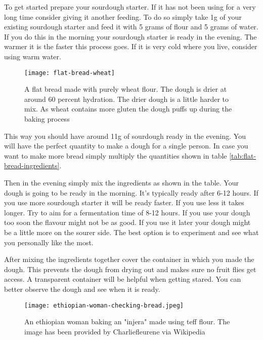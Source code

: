 To get started prepare your sourdough starter. If it has not been using for a very
long time consider giving it another feeding. To do so simply take 1g of your
existing sourdough starter and feed it with 5 grams of flour and 5 grams of water.
If you do this in the morning your sourdough starter is ready in the evening. The
warmer it is the faster this process goes. If it is very cold where you live, consider
using warm water.

\begin{figure}[htb!]
  \texttt{[image: flat-bread-wheat]}
  \centering
  \caption{A flat bread made with purely wheat flour. The dough is drier
  at around 60 percent hydration.  The drier dough is a little harder
  to mix. As wheat contains more gluten the dough puffs up during
  the baking process}
\end{figure}

This way you should have around 11g of sourdough ready in the evening. You will have
the perfect quantity to make a dough for a single person. In case you want to make more
bread simply multiply the quantities shown in table \ref*{tab:flat-bread-ingredients}.

Then in the evening simply mix the ingredients as shown in the table. Your dough
is going to be ready in the morning. It's typically ready after 6-12 hours. If
you use more sourdough starter it will be ready faster. If you use less it takes
longer. Try to aim for a fermentation time of 8-12 hours. If you use
your dough too soon the flavour might not be as good. If you use it later
your dough might be a little more on the sourer side. The best option is to experiment
and see what you personally like the most.

After mixing the ingredients together cover the container in which
you made the dough. This prevents the dough from drying out and makes
sure no fruit flies get access. A transparent container will be helpful
when getting stared. You can better observe the dough and see when
it is ready.

\begin{figure}[htb!]
  \texttt{[image: ethiopian-woman-checking-bread.jpeg]}
  \centering
  \caption{An ethiopian woman baking an "injera" made using teff flour. 
  The image has been provided by Charliefleurene via Wikipedia}
\end{figure}

